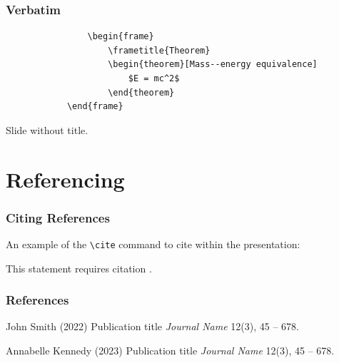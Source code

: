\documentclass[
11pt, %
]{beamer}
\begin{document}
	
	\begin{frame}[fragile] %
		\frametitle{Verbatim}
		
		\begin{example}
			\begin{verbatim}
				\begin{frame}
					\frametitle{Theorem}
					\begin{theorem}[Mass--energy equivalence]
						$E = mc^2$
					\end{theorem}
			\end{frame}\end{verbatim} %
		\end{example}
	\end{frame}
	
	
	\begin{frame}
		Slide without title.
	\end{frame}
	
	
	\section{Referencing}
	
	\begin{frame}
		\frametitle{Citing References}
		
		An example of the \texttt{\textbackslash cite} command to cite within the presentation:
		
		\bigskip %
		
		This statement requires citation \cite{p1,p2}.
	\end{frame}
	
	
	\begin{frame} %
		\frametitle{References}
		
		\begin{thebibliography}{99} %
			\footnotesize %
			
			\bibitem[Smith, 2022]{p1}
			John Smith (2022)
			\newblock Publication title
			\newblock \emph{Journal Name} 12(3), 45 -- 678.
			
			\bibitem[Kennedy, 2023]{p2}
			Annabelle Kennedy (2023)
			\newblock Publication title
			\newblock \emph{Journal Name} 12(3), 45 -- 678.
		\end{thebibliography}
	\end{frame}
	
\end{document}
